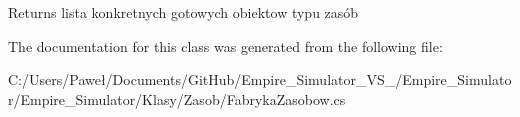 \begin{DoxyReturn}{Returns}
lista konkretnych gotowych obiektow typu zasób
\end{DoxyReturn}


The documentation for this class was generated from the following file\+:\begin{DoxyCompactItemize}
\item 
C\+:/\+Users/\+Paweł/\+Documents/\+Git\+Hub/\+Empire\+\_\+\+Simulator\+\_\+\+V\+S\+\_/\+Empire\+\_\+\+Simulator/\+Empire\+\_\+\+Simulator/\+Klasy/\+Zasob/Fabryka\+Zasobow.\+cs\end{DoxyCompactItemize}
